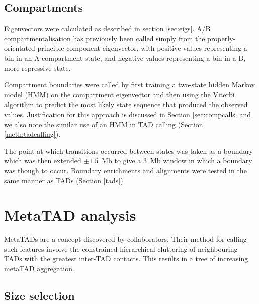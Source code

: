 \documentclass[a4paper,11pt,oneside]{book}
\begin{document}
\subsection{Compartments}\label{sec:compartments}

Eigenvectors were calculated as described in section \ref{sec:eigs}. A/B compartmentalisation has previously been called simply from the properly-orientated principle component eigenvector, with positive values representing a bin in an A compartment state, and negative values representing a bin in a B, more repressive state.\cite{Lieberman2009} 

Compartment boundaries were called by first training a two-state hidden
Markov model (HMM) on the compartment eigenvector and then using the
Viterbi algorithm to predict the most likely state sequence that
produced the observed values. Justification for this approach is discussed in Section \ref{sec:compcalls} and we also note the similar use of an HMM in TAD calling (Section \ref{meth:tadcalling}).


The point at which transitions occurred
between states was taken as a boundary which was then extended $\pm 1.5$~Mb to give a $3$~Mb window in which a boundary was though to occur. Boundary enrichments and alignments were tested in the same manner as TADs (Section \ref{tads}).

\section{MetaTAD analysis}\label{meth:meta}

MetaTADs are a concept discovered by collaborators. Their method for calling such features involve the constrained hierarchical cluttering of neighbouring TADs with the greatest inter-TAD contacts. This results in a tree of increasing metaTAD aggregation. %

\subsection{Size selection}\label{sec:metatad}
\end{document}
